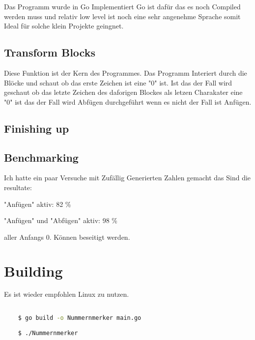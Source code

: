 \documentclass{article}
\begin{document}
Das Programm wurde in Go Implementiert Go ist dafür das es noch Compiled werden muss und relativ low level ist noch eine sehr angenehme Sprache somit Ideal für solche klein Projekte geingnet.

\subsection{Transform Blocks}

Diese Funktion ist der Kern des Programmes. Das Programm Interiert durch die Blöcke und schaut ob das erste Zeichen ist eine "0" ist. Ist das der Fall wird geschaut ob das letzte Zeichen des daforigen Blockes als letzen Charakater eine "0" ist das der Fall wird Abfügen durchgeführt wenn es nicht der Fall ist Anfügen.


\subsection{Finishing up}

\subsection{Benchmarking}

Ich hatte ein paar Versuche mit Zufällig Generierten Zahlen gemacht das Sind die resultate:

"Anfügen" aktiv: 82 \%

"Anfügen" und "Abfügen" aktiv:  98 \%

aller Anfangs 0. Können beseitigt werden.

\section{ Building }

Es ist wieder empfohlen Linux zu nutzen.

\begin{lstlisting}[language=Bash]

    $ go build -o Nummernmerker main.go

    $ ./Nummernmerker

\end{lstlisting}
\end{document}
